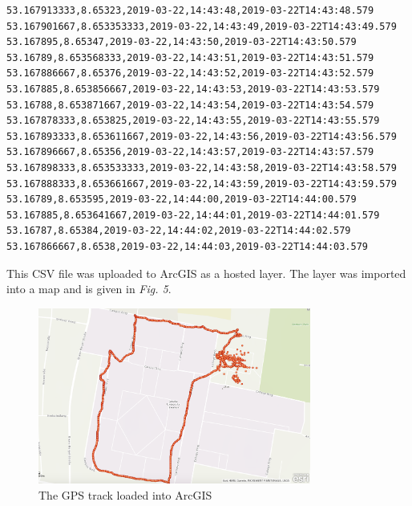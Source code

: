 \begin{verbatim}
53.167913333,8.65323,2019-03-22,14:43:48,2019-03-22T14:43:48.579
53.167901667,8.653353333,2019-03-22,14:43:49,2019-03-22T14:43:49.579
53.167895,8.65347,2019-03-22,14:43:50,2019-03-22T14:43:50.579
53.16789,8.653568333,2019-03-22,14:43:51,2019-03-22T14:43:51.579
53.167886667,8.65376,2019-03-22,14:43:52,2019-03-22T14:43:52.579
53.167885,8.653856667,2019-03-22,14:43:53,2019-03-22T14:43:53.579
53.16788,8.653871667,2019-03-22,14:43:54,2019-03-22T14:43:54.579
53.167878333,8.653825,2019-03-22,14:43:55,2019-03-22T14:43:55.579
53.167893333,8.653611667,2019-03-22,14:43:56,2019-03-22T14:43:56.579
53.167896667,8.65356,2019-03-22,14:43:57,2019-03-22T14:43:57.579
53.167898333,8.653533333,2019-03-22,14:43:58,2019-03-22T14:43:58.579
53.167888333,8.653661667,2019-03-22,14:43:59,2019-03-22T14:43:59.579
53.16789,8.653595,2019-03-22,14:44:00,2019-03-22T14:44:00.579
53.167885,8.653641667,2019-03-22,14:44:01,2019-03-22T14:44:01.579
53.16787,8.65384,2019-03-22,14:44:02,2019-03-22T14:44:02.579
53.167866667,8.6538,2019-03-22,14:44:03,2019-03-22T14:44:03.579
\end{verbatim}

This CSV file was uploaded to ArcGIS as a hosted layer. The layer was imported into a map and is given in \textit{Fig. 5}.

\vspace{1.0cm}

\begin{figure}
    \centering
        \includegraphics[width=0.8\textwidth]{images/arcgis-track.png}
        \caption{The GPS track loaded into ArcGIS}    
\end{figure}






